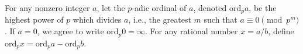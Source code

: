 For any nonzero integer $a$, let the $p$-adic ordinal of $a$, denoted $\text{ord}_p a$, be the highest power of $p$ which divides $a$, i.e., the greatest $m$ such that $a \equiv 0 \pmod{p^m}$. If $a = 0$, we agree to write $\text{ord}_p 0 = \infty$. For any rational number $x = a/b$, define $\text{ord}_p x = \text{ord}_p a - \text{ord}_p b$.
